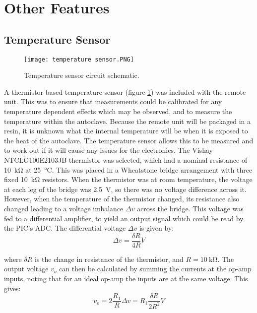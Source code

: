 \section{Other Features}

\subsection{Temperature Sensor}
\begin{figure}[htbp]
	\centering
	\texttt{[image: temperature sensor.PNG]}
	\caption{Temperature sensor circuit schematic.}
	\label{fig: temperature sensor}
\end{figure}

A thermistor based temperature sensor (figure \ref{fig: temperature sensor}) was included with the remote unit. This was to ensure that measurements could be calibrated for any temperature dependent effects which may be observed, and to measure the temperature within the autoclave. Because the remote unit will be packaged in a resin, it is unknown what the internal temperature will be when it is exposed to the heat of the autoclave. The temperature sensor allows this to be measured and to work out if it will cause any issues for the electronics. The Vishay NTCLG100E2103JB \cite{thermistor} thermistor was selected, which had a nominal resistance of \SI{10}{\kilo\ohm} at \SI{25}{\celsius}. This was placed in a Wheatstone bridge arrangement with three fixed \SI{10}{\kilo\ohm} resistors. When the thermistor was at room temperature, the voltage at each leg of the bridge was \SI{2.5}{\volt}, so there was no voltage difference across it. However, when the temperature of the thermistor changed, its resistance also changed leading to a voltage imbalance $\Delta v$ across the bridge. This voltage was fed to a differential amplifier, to yield an output signal which could be read by the PIC's ADC. The differential voltage $\Delta v$ is given by:\\
\begin{equation}
\Delta v = \frac{\delta R}{4 R}V
\end{equation}

where $\delta R$ is the change in resistance of the thermistor, and $R=\SI{10}{\kilo\ohm}$. The output voltage $v_o$ can then be calculated by summing the currents at the op-amp inputs, noting that for an ideal op-amp the inputs are at the same voltage. This gives:\\
\begin{equation}
v_o = 2 \frac{R_1}{R} \Delta v =R_1 \frac{\delta R}{2 R^2}V
\end{equation}

